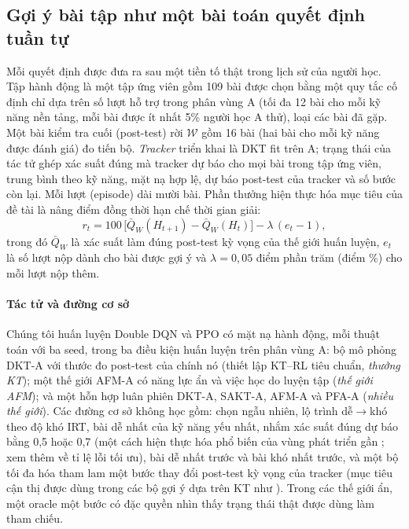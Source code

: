 \documentclass[a4paper,preprint,12pt,authoryear]{elsarticle}
\begin{document}
\subsection{Gợi ý bài tập như một bài toán quyết định tuần tự}\label{sec:mdp}

Mỗi quyết định được đưa ra sau một tiền tố thật trong lịch sử của người học. Tập hành động là một tập ứng viên gồm 109 bài được chọn bằng một quy tắc cố định chỉ dựa trên số lượt hỗ trợ trong phân vùng A (tối đa 12 bài cho mỗi kỹ năng nền tảng, mỗi bài được ít nhất 5\% người học A thử), loại các bài đã gặp. Một bài kiểm tra cuối (post-test) rời $\mathcal W$ gồm 16 bài (hai bài cho mỗi kỹ năng được đánh giá) đo tiến bộ. \emph{Tracker} triển khai là DKT fit trên A; trạng thái của tác tử ghép xác suất đúng mà tracker dự báo cho mọi bài trong tập ứng viên, trung bình theo kỹ năng, mặt nạ hợp lệ, dự báo post-test của tracker và số bước còn lại. Mỗi lượt (episode) dài mười bài. Phần thưởng hiện thực hóa mục tiêu của đề tài là nâng điểm đồng thời hạn chế thời gian giải:
\begin{equation}
r_t = 100\,\bigl[\bar Q_W(H_{t+1}) - \bar Q_W(H_t)\bigr] - \lambda\,(e_t-1),
\label{eq:reward}
\end{equation}
trong đó $\bar Q_W$ là xác suất làm đúng post-test kỳ vọng của thế giới huấn luyện, $e_t$ là số lượt nộp dành cho bài được gợi ý và $\lambda=0{,}05$ điểm phần trăm (điểm \%) cho mỗi lượt nộp thêm.

\paragraph{Tác tử và đường cơ sở} Chúng tôi huấn luyện Double DQN \citep{mnih2015dqn,vanhasselt2016ddqn} và PPO \citep{schulman2017ppo} có mặt nạ hành động, mỗi thuật toán với ba seed, trong ba điều kiện huấn luyện trên phân vùng A: bộ mô phỏng DKT-A với thước đo post-test của chính nó (thiết lập KT--RL tiêu chuẩn, \emph{thưởng KT}); một thế giới AFM-A có năng lực ẩn và việc học do luyện tập (\emph{thế giới AFM}); và một hỗn hợp luân phiên DKT-A, SAKT-A, AFM-A và PFA-A (\emph{nhiều thế giới}). Các đường cơ sở không học gồm: chọn ngẫu nhiên, lộ trình dễ$\to$khó theo độ khó IRT, bài dễ nhất của kỹ năng yếu nhất, nhắm xác suất đúng dự báo bằng 0,5 hoặc 0,7 (một cách hiện thực hóa phổ biến của vùng phát triển gần \citep{vygotsky1978mind}; xem thêm \citealp{wilson2019eighty} về tỉ lệ lỗi tối ưu), bài dễ nhất trước và bài khó nhất trước, và một bộ tối đa hóa tham lam một bước thay đổi post-test kỳ vọng của tracker (mục tiêu cận thị được dùng trong các bộ gợi ý dựa trên KT như \citet{ozyurt2025exrec}). Trong các thế giới ẩn, một oracle một bước có đặc quyền nhìn thấy trạng thái thật được dùng làm tham chiếu.
\end{document}
